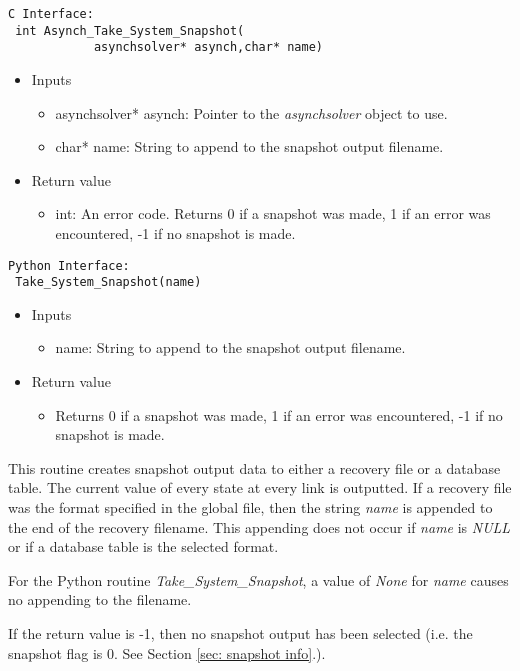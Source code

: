 \documentclass[12pt]{article}
\begin{document}
\begin{lstlisting}[style=CStyle]
 C Interface:
 int Asynch_Take_System_Snapshot(
		    asynchsolver* asynch,char* name)
\end{lstlisting}
\begin{itemize}
 \item Inputs
  \begin{itemize}
   \item asynchsolver* asynch: Pointer to the \emph{asynchsolver} object to use.
   \item char* name: String to append to the snapshot output filename.
  \end{itemize}
 \item Return value
  \begin{itemize}
   \item int: An error code. Returns 0 if a snapshot was made, 1 if an error was encountered, -1 if no snapshot is made.
  \end{itemize}
\end{itemize}
\begin{lstlisting}[style=PythonStyle]
 Python Interface:
 Take_System_Snapshot(name)
\end{lstlisting}
\begin{itemize}
 \item Inputs
  \begin{itemize}
   \item name: String to append to the snapshot output filename.
  \end{itemize}
 \item Return value
  \begin{itemize}
   \item Returns 0 if a snapshot was made, 1 if an error was encountered, -1 if no snapshot is made.
  \end{itemize}
\end{itemize}
This routine creates snapshot output data to either a recovery file or a database table. The current value of every state at every link is outputted. If a recovery file was the format specified in the global file, then the string \emph{name} is appended to the end of the recovery filename. This appending does not occur if \emph{name} is \emph{NULL} or if a database table is the selected format.

For the Python routine \emph{Take\_System\_Snapshot}, a value of \emph{None} for \emph{name} causes no appending to the filename.

If the return value is -1, then no snapshot output has been selected (i.e. the snapshot flag is 0. See Section \ref{sec: snapshot info}.).
\end{document}
